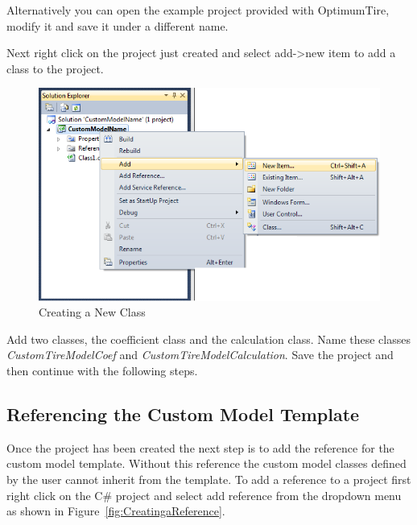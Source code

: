 Alternatively you can open the example project provided with OptimumTire, modify it and save it under a different name.

Next right click on the project just created and select add->new item to add a class to the project.

 \begin{figure}[H]
	\centering
		\includegraphics[width=1.0\textwidth]{NewCustomModelClass.png}
	\caption{Creating a New Class}
	\label{fig:CreatingaNewClass}
\end{figure}

Add two classes, the coefficient class and the calculation class. Name these classes \textsl{CustomTireModelCoef} and \textsl{CustomTireModelCalculation}. Save the project and then continue with the following steps.

\subsection{Referencing the Custom Model Template}
\label{sec:ReferencingtheCustomModelTemplate}

Once the project has been created the next step is to add the reference for the custom model template. Without this reference the custom model classes defined by the user cannot inherit from the template.
To add a reference to a project first right click on the C\# project and select add reference from the dropdown menu as shown in Figure~\ref{fig:CreatingaReference}.

